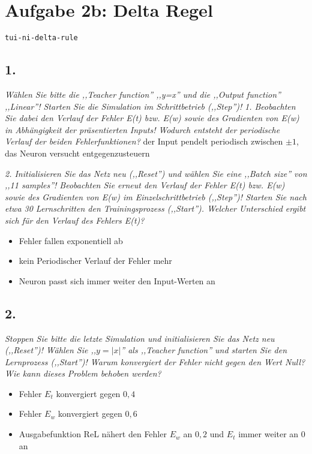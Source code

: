 \documentclass[a4paper,10pt,titlepage]{scrartcl}
\begin{document}
\section*{Aufgabe 2b: Delta Regel}
\lstinline{tui-ni-delta-rule}

\subsection*{1.}
\textit{Wählen Sie bitte die ,,Teacher function'' ,,y=x'' und die ,,Output function'' ,,Linear''! Starten Sie die Simulation im Schrittbetrieb (,,Step'')!}
\textit{1. Beobachten Sie dabei den Verlauf der Fehler E(t) bzw. E(w) sowie des Gradienten von E(w) in Abhängigkeit der präsentierten Inputs! Wodurch entsteht der periodische Verlauf der beiden Fehlerfunktionen?}
der Input pendelt periodisch zwischen $\pm 1$, das Neuron versucht entgegenzusteuern

\textit{2. Initialisieren Sie das Netz neu (,,Reset'') und wählen Sie eine ,,Batch size'' von ,,11 samples''! Beobachten Sie erneut den Verlauf der Fehler E(t) bzw. E(w) sowie des Gradienten von E(w) im Einzelschrittbetrieb (,,Step'')! Starten Sie nach etwa 30 Lernschritten den Trainingsprozess (,,Start''). Welcher Unterschied ergibt sich für den Verlauf des Fehlers E(t)?}
\begin{itemize}
    \item Fehler fallen exponentiell ab
    \item kein Periodischer Verlauf der Fehler mehr
    \item Neuron passt sich immer weiter den Input-Werten an
\end{itemize}

\subsection*{2.}
\textit{Stoppen Sie bitte die letzte Simulation und initialisieren Sie das Netz neu (,,Reset'')! Wählen Sie ,,$y=|x|$'' als ,,Teacher function'' und starten Sie den Lernprozess (,,Start'')! Warum konvergiert der Fehler nicht gegen den Wert Null? Wie kann dieses Problem behoben werden?}
\begin{itemize}
    \item Fehler $E_t$ konvergiert gegen $0,4$
    \item Fehler $E_w$ konvergiert gegen $0,6$
    \item Ausgabefunktion ReL nähert den Fehler $E_w$ an $0,2$ und $E_t$ immer weiter an $0$ an
\end{itemize}
\end{document}

